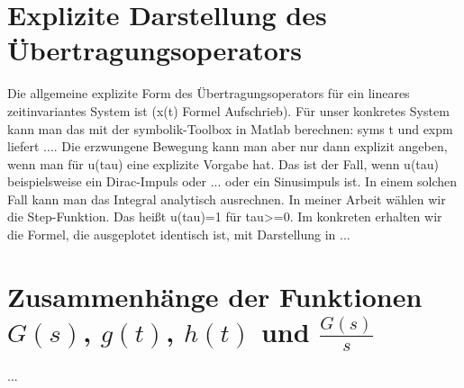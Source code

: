 \documentclass[
  ngerman
  ,12pt
  ,pdftex
]{article}
\begin{document}



\section{Explizite Darstellung des Übertragungsoperators} %
Die allgemeine explizite Form des Übertragungsoperators für ein lineares zeitinvariantes System ist (x(t) Formel Aufschrieb).
Für unser konkretes System kann man das mit der symbolik-Toolbox in Matlab berechnen: syms t und expm liefert ....
Die erzwungene Bewegung kann man aber nur dann explizit angeben, wenn man für u(tau) eine explizite Vorgabe hat. Das ist der Fall, wenn u(tau) beispielsweise ein Dirac-Impuls oder ... 
oder ein Sinusimpuls ist. In einem solchen Fall kann man das Integral analytisch ausrechnen. In meiner Arbeit wählen wir die Step-Funktion. 
Das heißt u(tau)=1 für tau>=0. Im konkreten erhalten wir die Formel, die ausgeplotet identisch ist, mit Darstellung in ...







\section{Zusammenhänge der Funktionen $G(s)$, $g(t)$, $h(t)$ und $\frac{G(s)}{s}$}
...
\end{document}
